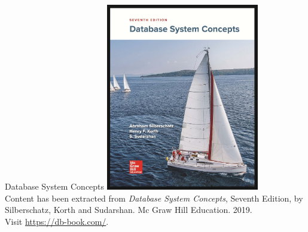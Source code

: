 \documentclass{beamer}
\begin{document}
\begin{frame}{Database System Concepts}
    \centering
    \includegraphics[width=0.5\textwidth]{figures/book_cover.jpg} \\
    \vspace{5mm}
    {
        \tiny
        Content has been extracted from \textit{Database System Concepts}, Seventh Edition, by Silberschatz, Korth and Sudarshan. Mc Graw Hill Education. 2019.\\
        Visit \url{https://db-book.com/}.\\
    }
\end{frame}
\end{document}
